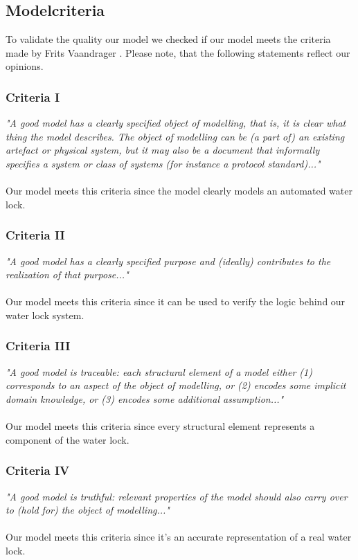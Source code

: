 \documentclass{article}
\begin{document}
        
    \subsection{Modelcriteria} %
        To validate the quality our model we checked if our model meets the criteria made by Frits Vaandrager \cite{Vaandrager}. Please note, that the following statements reflect our opinions. 
        
        \subsubsection{Criteria I}
            \textit{"A good model has a clearly specified object of modelling, that is, it is clear what thing the model describes. The object of modelling can be (a part of) an existing artefact or physical system, but it may also be a document that informally specifies a system or class of systems (for instance a protocol standard)..."} \\\\
            Our model meets this criteria since the model clearly models an automated water lock.
        
        \subsubsection{Criteria II}
            \textit{"A good model has a clearly specified purpose and (ideally) contributes to the realization of that purpose..."} \\\\
            Our model meets this criteria since it can be used to verify the logic behind our water lock system.
         
        \subsubsection{Criteria III}
            \textit{"A good model is traceable: each structural element of a model either (1) corresponds to an aspect of the object of modelling, or (2) encodes some implicit domain knowledge, or (3) encodes some additional assumption..."} \\\\
            Our model meets this criteria since every structural element represents a component of  the water lock.
         
         \subsubsection{Criteria IV}
            \textit{"A good model is truthful: relevant properties of the model should also carry over to (hold for) the object of modelling..."}\\\\
            Our model meets this criteria since it's an accurate representation of a real water lock.
         
\end{document}
